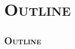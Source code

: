 

\section*{\textsc{Outline}}

\begin{frame}
\frametitle{\textsc{Outline}}
\tableofcontents%
\end{frame}
